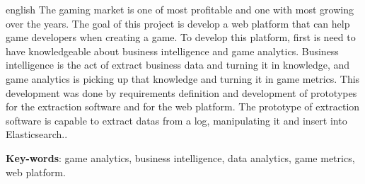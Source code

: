 \begin{resumo}[Abstract]
 \begin{otherlanguage*}{english}
   The gaming market is one of most profitable and one with most growing over the years. The goal of this project is develop a web platform that can help game developers when  creating a game. To develop this platform, first is need to have knowledgeable about business intelligence and game analytics. Business intelligence is the act of extract business data and turning it in knowledge, and game analytics is picking up that knowledge and turning it in game metrics. This development was done by requirements definition and development of prototypes for the extraction software and for the web platform. The prototype of extraction software is capable to extract datas from a log, manipulating it and insert into Elasticsearch..

   \vspace{\onelineskip}
 
   \noindent 
   \textbf{Key-words}: game analytics, business intelligence, data analytics, game metrics, web platform.
 \end{otherlanguage*}
\end{resumo}
